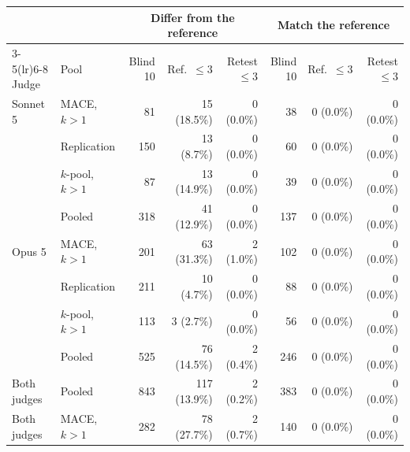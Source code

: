 \begin{tabular}{llrrrrrr}
\toprule
 & & \multicolumn{3}{c}{Differ from the reference} & \multicolumn{3}{c}{Match the reference} \\
\cmidrule(lr){3-5}\cmidrule(lr){6-8}
Judge & Pool & Blind 10 & Ref.\ $\leq 3$ & Retest $\leq 3$ & Blind 10 & Ref.\ $\leq 3$ & Retest $\leq 3$ \\
\midrule
Sonnet 5 & \textsc{MACE}, $k{>}1$ & 81 & 15 (18.5\%) & 0 (0.0\%) & 38 & 0 (0.0\%) & 0 (0.0\%) \\
 & Replication & 150 & 13 (8.7\%) & 0 (0.0\%) & 60 & 0 (0.0\%) & 0 (0.0\%) \\
 & $k$-pool, $k{>}1$ & 87 & 13 (14.9\%) & 0 (0.0\%) & 39 & 0 (0.0\%) & 0 (0.0\%) \\
 & Pooled & 318 & 41 (12.9\%) & 0 (0.0\%) & 137 & 0 (0.0\%) & 0 (0.0\%) \\
\addlinespace
Opus 5 & \textsc{MACE}, $k{>}1$ & 201 & 63 (31.3\%) & 2 (1.0\%) & 102 & 0 (0.0\%) & 0 (0.0\%) \\
 & Replication & 211 & 10 (4.7\%) & 0 (0.0\%) & 88 & 0 (0.0\%) & 0 (0.0\%) \\
 & $k$-pool, $k{>}1$ & 113 & 3 (2.7\%) & 0 (0.0\%) & 56 & 0 (0.0\%) & 0 (0.0\%) \\
 & Pooled & 525 & 76 (14.5\%) & 2 (0.4\%) & 246 & 0 (0.0\%) & 0 (0.0\%) \\
\addlinespace
Both judges & Pooled & 843 & 117 (13.9\%) & 2 (0.2\%) & 383 & 0 (0.0\%) & 0 (0.0\%) \\
Both judges & \textsc{MACE}, $k{>}1$ & 282 & 78 (27.7\%) & 2 (0.7\%) & 140 & 0 (0.0\%) & 0 (0.0\%) \\
\bottomrule
\end{tabular}
